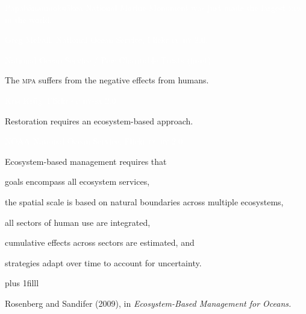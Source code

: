 \documentclass[t]{beamer}
\begin{document}
{
\begin{frame}[b]{\textcolor{white}{Papah\={a}naumoku\={a}kea National Marine Monument was just made the largest \textsc{mpa} in the world.}}

\hfill\tiny\textcolor{white}{Greg McFall, National Ocean Service, Flickr  \textsc{cc by} 2.0.}
\end{frame}
}

{
\begin{frame}[b]{}


\hfill\tiny\textcolor{white}{National Ocean Service / Pew Charitable Trusts (inset).}
\end{frame}
}


{
\begin{frame}[b]{The \textsc{mpa} suffers from the negative effects from humans.}


\hfill\tiny\textcolor{white}{Kris Krüg, Flickr \textsc{cc by-sa} 2.0.}
\end{frame}
}

{
\begin{frame}[b]{Restoration requires an \textcolor{orange7}{ecosystem-based approach.}}


\hfill\tiny\textcolor{white}{NOAA National Ocean Service, Flickr \textsc{cc by} 2.0.}
\end{frame}
}

\begin{frame}[t]{Ecosystem-based management requires that }

\hangpara goals encompass all ecosystem services,

\hangpara the spatial scale is based on natural boundaries across multiple ecosystems,

\hangpara all sectors of human use are integrated,

\hangpara cumulative effects across sectors are estimated, and

\hangpara strategies adapt over time to account for uncertainty.

\vskip0pt plus 1filll

\hfill\tiny Rosenberg and Sandifer (2009), in \textit{Ecosystem-Based Management for Oceans.}
\end{frame}
\end{document}
